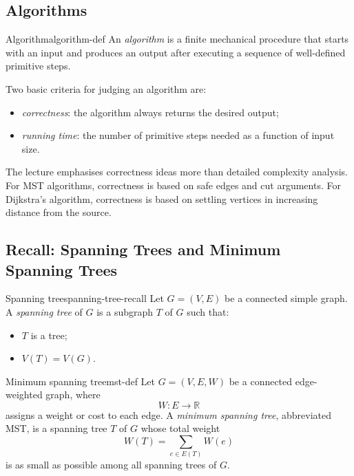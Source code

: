 \subsection{Algorithms}

\begin{definition}{Algorithm}{algorithm-def}
An \emph{algorithm} is a finite mechanical procedure that starts with an input and produces an output after executing a sequence of well-defined primitive steps.
\end{definition}

Two basic criteria for judging an algorithm are:
\begin{itemize}[leftmargin=*]
    \item \emph{correctness}: the algorithm always returns the desired output;
    \item \emph{running time}: the number of primitive steps needed as a function of input size.
\end{itemize}

\begin{examtip}[title={How algorithms are assessed in this handout}]
The lecture emphasises correctness ideas more than detailed complexity analysis. For MST algorithms, correctness is based on safe edges and cut arguments. For Dijkstra's algorithm, correctness is based on settling vertices in increasing distance from the source.
\end{examtip}

\subsection{Recall: Spanning Trees and Minimum Spanning Trees}

\begin{definition}{Spanning tree}{spanning-tree-recall}
Let \(G=(V,E)\) be a connected simple graph. A \emph{spanning tree} of \(G\) is a subgraph \(T\) of \(G\) such that:
\begin{itemize}[leftmargin=*]
    \item \(T\) is a tree;
    \item \(V(T)=V(G)\).
\end{itemize}
\end{definition}

\begin{definition}{Minimum spanning tree}{mst-def}
Let \(G=(V,E,W)\) be a connected edge-weighted graph, where
\[
W:E\to \mathbb{R}
\]
assigns a weight or cost to each edge. A \emph{minimum spanning tree}, abbreviated MST, is a spanning tree \(T\) of \(G\) whose total weight
\[
W(T)=\sum_{e\in E(T)}W(e)
\]
is as small as possible among all spanning trees of \(G\).
\end{definition}

